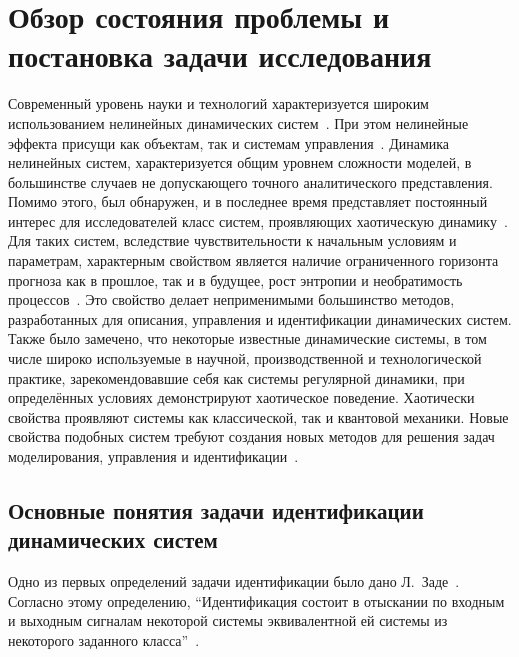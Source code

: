 \chapter{Обзор состояния проблемы и постановка задачи исследования}

Современный уровень науки и технологий характеризуется
широким использованием нелинейных динамических
систем~\cite{andronov_vitt_haikin,anisch_nonlin_eff,mishenko_du_small_relax,nonlin_vibro,malinetskii_modern_methods_nl_dyn}.
При этом нелинейные эффекта присущи как объектам,
так и системам управления~\cite{kubik_nlsc,vukobr_nonadopt}. Динамика нелинейных систем,
характеризуется общим уровнем сложности моделей,
в большинстве случаев не допускающего
точного аналитического представления.
Помимо этого, был обнаружен, и в последнее время представляет
постоянный интерес для исследователей класс систем,
проявляющих хаотическую динамику~\cite{moon_chaotic_vibr,magni_theory_dyn_chaos,kuznetsov_dyn_chaos,neimark_stoch_chaos_vibro,anisch_reg_and_chaotic_vibro}.
Для таких систем, вследствие чувствительности к начальным условиям
и параметрам, характерным свойством является наличие ограниченного горизонта прогноза как
в прошлое, так и в будущее, рост энтропии
и необратимость процессов~\cite{chernavskii_syn_info,prigogine_from_existent,koltsova_nl_dyn_chem}.
Это свойство делает неприменимыми
большинство методов, разработанных для описания, управления и
идентификации динамических систем. Также было замечено,
что некоторые известные динамические системы, в том числе широко
используемые в научной, производственной и технологической практике,
зарекомендовавшие себя как системы регулярной динамики,
при определённых условиях демонстрируют хаотическое поведение.
Хаотически свойства проявляют системы как классической,
так и квантовой механики.
Новые свойства подобных систем требуют создания новых
методов для решения задач моделирования,
управления и идентификации~\cite{karabutov_adapt_id_sys,dmitriev_trans_chaos_lowpower}.


\section{Основные понятия задачи идентификации динамических систем} %

Одно из первых определений задачи идентификации было дано
Л.~Заде~\cite{zadeh_id_1956}.
Согласно этому определению,
``Идентификация состоит в отыскании по входным и выходным сигналам
некоторой системы эквивалентной ей системы
из некоторого заданного класса''~\cite{eykhoff_id_base,eykhoff_modern_id,lung_id_sys}.


